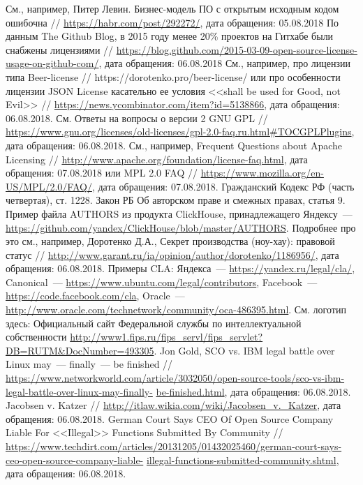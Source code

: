 \documentclass[10pt, a5paper]{article}
\begin{document}
\begin{thebibliography}{20}
 См., например, Питер Левин. Бизнес-модель ПО с открытым исходным кодом ошибочна // \url{https://habr.com/post/292272/}, дата обращения: 05.08.2018
 По данным The Github Blog, в 2015 году менее 20\% проектов на Гитхабе были снабжены лицензиями // \url{https://blog.github.com/2015-03-09-open-source-license-usage-on-github-com/}, дата обращения: 06.08.2018
 См., например, про лицензии типа Beer-license // https://dorotenko.pro/beer-license/ или про особенности лицензии JSON License касательно ее условия <<shall be used for Good, not Evil>> // \url{https://news.ycombinator.com/item?id=5138866}, дата обращения:  06.08.2018.
 См. Ответы на вопросы о версии 2 GNU GPL // \url{https://www.gnu.org/licenses/old-licenses/gpl-2.0-faq.ru.html\#TOCGPLPlugins}, дата обращения: 06.08.2018.
 См., например, Frequent Questions about Apache Licensing // \url{http://www.apache.org/foundation/license-faq.html}, дата обращения: 07.08.2018  или   MPL 2.0 FAQ // \url{https://www.mozilla.org/en-US/MPL/2.0/FAQ/},  дата обращения: 07.08.2018.
 Гражданский Кодекс РФ (часть четвертая), ст. 1228.
 Закон РБ Об авторском праве и смежных правах, статья 9.
 Пример файла AUTHORS из продукта ClickHouse, принадлежащего Яндексу~--- \url{https://github.com/yandex/ClickHouse/blob/master/AUTHORS}.
 Подробнее про это см., например, Доротенко Д.А., Секрет производства (ноу-хау): правовой статус // \url{http://www.garant.ru/ia/opinion/author/dorotenko/1186956/}, дата обращения: 06.08.2018.
 Примеры CLA: Яндекса~--- \url{https://yandex.ru/legal/cla/}, Canonical~--- \url{https://www.ubuntu.com/legal/contributors}, Facebook~--- \url{https://code.facebook.com/cla}, Oracle~--- \url{http://www.oracle.com/technetwork/community/oca-486395.html}.
 См. логотип здесь: Официальный сайт Федеральной службы по интеллектуальной собственности \url{http://www1.fips.ru/fips\_servl/fips\_servlet?DB=RUTM\&DocNumber=493305}.
 Jon Gold, SCO vs. IBM legal battle over Linux may~--- finally~--- be finished // \url{https://www.networkworld.com/article/3032050/open-source-tools/sco-vs-ibm-legal-battle-over-linux-may-finally-} \url{be-finished.html}, дата обращения: 06.08.2018.
 Jacobsen v. Katzer // \url{http://itlaw.wikia.com/wiki/Jacobsen\_v.\_Katzer}, дата обращения: 06.08.2018.
 German Court Says CEO Of Open Source Company Liable For <<Illegal>> Functions Submitted By Community // \url{https://www.techdirt.com/articles/20131205/01432025460/german-court-says-ceo-open-source-company-liable-} \url{illegal-functions-submitted-community.shtml},   дата обращения: 06.08.2018.
\end{thebibliography}
\end{document}

